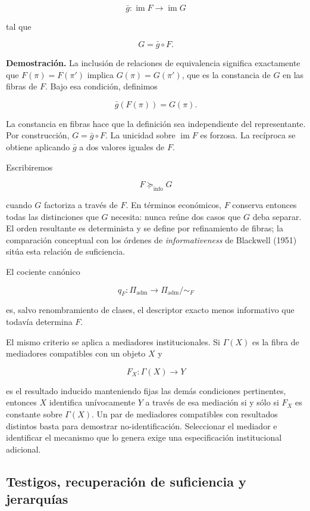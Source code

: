 \documentclass[10pt,a5paper,twoside]{article}
\begin{document}
\[
\bar g:\operatorname{im}F\to\operatorname{im}G
\]

tal que

\[
G=\bar g\circ F.
\]

\textbf{Demostración.} La inclusión de relaciones de equivalencia
significa exactamente que \(F(\pi)=F(\pi')\) implica \(G(\pi)=G(\pi')\),
que es la constancia de \(G\) en las fibras de \(F\). Bajo esa
condición, definimos

\[
\bar g(F(\pi))=G(\pi).
\]

La constancia en fibras hace que la definición sea independiente del
representante. Por construcción, \(G=\bar g\circ F\). La unicidad sobre
\(\operatorname{im}F\) es forzosa. La recíproca se obtiene aplicando
\(\bar g\) a dos valores iguales de \(F\).

Escribiremos

\[
F\succeq_{\mathrm{info}}G
\]

cuando \(G\) factoriza a través de \(F\). En términos económicos, \(F\)
conserva entonces todas las distinciones que \(G\) necesita: nunca reúne
dos casos que \(G\) deba separar. El orden resultante es determinista y
se define por refinamiento de fibras; la comparación conceptual con los
órdenes de \emph{informativeness} de Blackwell (1951) sitúa esta relación
de suficiencia.

El cociente canónico

\[
q_F:
\Pi_{\mathrm{adm}}
\to
\Pi_{\mathrm{adm}}/\sim_F
\]

es, salvo renombramiento de clases, el descriptor exacto menos
informativo que todavía determina \(F\).

El mismo criterio se aplica a mediadores institucionales. Si
\(\Gamma(X)\) es la fibra de mediadores compatibles con un objeto \(X\)
y

\[
F_X:\Gamma(X)\to Y
\]

es el resultado inducido manteniendo fijas las demás condiciones
pertinentes, entonces \(X\) identifica unívocamente \(Y\) a través de
esa mediación si y sólo si \(F_X\) es constante sobre \(\Gamma(X)\). Un
par de mediadores compatibles con resultados distintos basta para
demostrar no-identificación. Seleccionar el mediador e identificar el mecanismo que lo genera exige una
especificación institucional adicional.

\subsection{Testigos, recuperación de suficiencia y jerarquías}\label{testigos-recuperaciuxf3n-de-suficiencia-y-jerarquuxedas}
\end{document}
